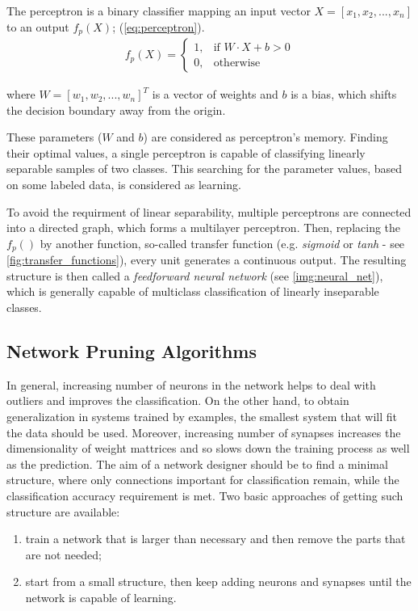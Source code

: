 The perceptron \citep{article:perceptron} is a binary classifier mapping an input vector $ X = [x_1, x_2, ..., x_n] $ to an output $ f_p(X) $; (\cref{eq:perceptron}).
\noindent
\begin{align} \label{eq:perceptron}
f_p(X) = 
\begin{cases}
    1, & \text{if }  W \cdot X + b > 0\\
    0,              & \text{otherwise}
\end{cases}
\end{align}

where $ W = [w_1, w_2, ..., w_n]^T $ is a vector of weights and $ b $ is a bias, which shifts the decision boundary away from the origin.

These parameters ($ W $ and $ b $) are considered as perceptron's memory. Finding their optimal values, a single perceptron is capable of classifying linearly separable samples of two classes. This searching for the parameter values, based on some labeled data, is considered as learning.

To avoid the requirment of linear separability, multiple perceptrons are connected into a directed graph, which forms a multilayer perceptron. Then, replacing the $ f_p() $ by another function, so-called transfer function (e.g. \textit{sigmoid} or \textit{tanh} - see \cref{fig:transfer_functions}), every unit generates a continuous output. The resulting structure is then called a \textit{feedforward neural network} (see \cref{img:neural_net}), which is generally capable of multiclass classification of linearly inseparable classes.

\subsection*{Network Pruning Algorithms} \label{sec:soa_pruning_algorithms}
In general, increasing number of neurons in the network helps to deal with outliers and improves the classification. On the other hand, to obtain generalization in systems trained by examples, the smallest system that will fit the data should be used. Moreover, increasing number of synapses increases the dimensionality of weight mattrices and so slows down the training process as well as the prediction. The aim of a network designer should be to find a minimal structure, where only connections important for classification remain, while the classification accuracy requirement is met. Two basic approaches of getting such structure are available:

\begin{enumerate}
\item train a network that is larger than necessary and then remove the parts that are not needed;
\item start from a small structure, then keep adding neurons and synapses until the network is capable of learning.
\end{enumerate}

